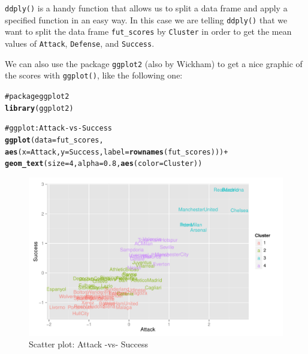 \documentclass[12pt]{book}\usepackage{graphicx, color}
\makeatletter
\newcommand{\hlfunctioncall}[1]{\textcolor[rgb]{0.501960784313725,0,0.329411764705882}{\textbf{#1}}}%
\newcommand{\hlcomment}[1]{\textcolor[rgb]{0.180392156862745,0.6,0.341176470588235}{#1}}%
\newenvironment{kframe}{%
 \def\at@end@of@kframe{}%
 \ifinner\ifhmode%
  \def\at@end@of@kframe{\end{minipage}}%
  \begin{minipage}{\columnwidth}%
 \fi\fi%
 \def\FrameCommand##1{\hskip\@totalleftmargin \hskip-\fboxsep
 \colorbox{shadecolor}{##1}\hskip-\fboxsep
     \hskip-\linewidth \hskip-\@totalleftmargin \hskip\columnwidth}%
 \MakeFramed {\advance\hsize-\width
   \@totalleftmargin\z@ \linewidth\hsize
   \@setminipage}}%
 {\par\unskip\endMakeFramed%
 \at@end@of@kframe}
\newenvironment{knitrout}{}{} %
\newcommand{\code}[1]{\texttt{#1}}
\makeatother
\begin{document}
\code{ddply()} is a handy function that allows us to split a data frame and apply a specified function in an easy way. In this case we are telling \code{ddply()} that we want to split the data frame \code{fut\_scores} by \code{Cluster} in order to get the mean values of \code{Attack}, \code{Defense}, and \code{Success}.

We can also use the package \code{ggplot2} (also by Wickham) to get a nice graphic of the scores with \code{ggplot()}, like the following one:
\begin{knitrout}
\color{fgcolor}\begin{kframe}
\begin{alltt}
\hlcomment{# package ggplot2}
\hlfunctioncall{library}(ggplot2)

\hlcomment{# ggplot: Attack -vs- Success}
\hlfunctioncall{ggplot}(data = fut_scores, 
       \hlfunctioncall{aes}(x = Attack, y = Success, label = \hlfunctioncall{rownames}(fut_scores))) + 
  \hlfunctioncall{geom_text}(size = 4, alpha = 0.8, \hlfunctioncall{aes}(color = Cluster))
\end{alltt}
\end{kframe}\begin{figure}[h]


{\centering \includegraphics[width=0.95\linewidth,height=.65\linewidth]{figure/futbol_scores_ggplot} 

}

\caption[Scatter plot]{Scatter plot: Attack -vs- Success\label{fig:futbol_scores_ggplot}}
\end{figure}


\end{knitrout}
\end{document}
